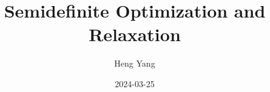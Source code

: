 \documentclass[
]{book}
\title{Semidefinite Optimization and Relaxation}
\author{Heng Yang}
\date{2024-03-25}
\theoremstyle{definition}
\theoremstyle{definition}
\theoremstyle{definition}
\theoremstyle{definition}
\theoremstyle{remark}
\begin{document}
\maketitle

{
\setcounter{tocdepth}{1}
\tableofcontents
}
\newcommand{\calG}{\mathcal{G}}
\newcommand{\calV}{\mathcal{V}}
\newcommand{\calE}{\mathcal{E}}
\newcommand{\calF}{\mathcal{F}}
\newcommand{\calP}{\mathcal{P}}
\newcommand{\calQ}{\mathcal{Q}}
\newcommand{\calA}{\mathcal{A}}
\newcommand{\calK}{\mathcal{K}}
\newcommand{\calS}{\mathcal{S}}
\newcommand{\calM}{\mathcal{M}}
\newcommand{\calI}{\mathcal{I}}
\newcommand{\calR}{\mathcal{R}}
\newcommand{\calZ}{\mathcal{Z}}
\newcommand{\mathx}{\mathrm{x}}
\newcommand{\mathy}{\mathrm{y}}
\newcommand{\bbE}{\mathbb{E}}
\newcommand{\calN}{\mathcal{N}}
\newcommand{\tldR}{\tilde{R}}
\newcommand{\bbZ}{\mathbb{Z}}
\newcommand{\bbQ}{\mathbb{Q}}
\newcommand{\bbC}{\mathbb{C}}
\newcommand{\bbF}{\mathbb{F}}
\newcommand{\bbR}{\mathbb{R}}

\newcommand{\Real}[1]{\mathbb{R}^{#1}}
\newcommand{\Comp}[1]{\mathbb{C}^{#1}}
\newcommand{\sym}[1]{\mathbb{S}^{#1}}
\newcommand{\psd}[1]{\sym{#1}_{+}}
\newcommand{\pd}[1]{\sym{#1}_{++}}
\newcommand{\inprod}[2]{\langle #1, #2 \rangle}
\newcommand{\linprod}[2]{\left\langle #1, #2 \right\rangle}
\newcommand{\trace}{\mathrm{tr}}
\newcommand{\tran}{^\top}

\newcommand{\rank}{\mathrm{rank}}
\newcommand{\diag}{\mathrm{diag}}
\newcommand{\Diag}{\mathrm{Diag}}
\newcommand{\BlkDiag}{\mathrm{BlkDiag}}
\newcommand{\vectorize}{\mathrm{vec}}
\newcommand{\svec}{\mathrm{svec}}
\newcommand{\mat}{\mathrm{mat}}
\newcommand{\smat}{\mathrm{smat}}
\newcommand{\norm}[1]{\Vert #1 \Vert}
\newcommand{\lnorm}[1]{\left\Vert #1 \right\Vert}
\newcommand{\pnorm}[2]{\Vert #1 \Vert_{#2}}
\newcommand{\Fnorm}[1]{\Vert #1 \Vert_\mathrm{F}}
\newcommand{\conv}{\mathrm{conv}}
\newcommand{\cone}{\mathrm{cone}}
\newcommand{\interior}{\mathrm{int}}
\newcommand{\relint}{\mathrm{ri}}
\newcommand{\poly}[1]{\mathbb{R}[#1]}
\newcommand{\SOd}{\mathrm{SO}(d)}
\newcommand{\SOthree}{\mathrm{SO}(3)}
\newcommand{\Od}{\mathrm{O}(d)}
\newcommand{\Ogroup}{\mathrm{O}}
\newcommand{\usphere}{\mathcal{S}}
\newcommand{\bmath}[1]{\boldsymbol{#1}}
\newcommand{\lbrkt}{[\![}
\newcommand{\rbrkt}{]\!]}
\newcommand{\brkt}[1]{\lbrkt #1 \rbrkt}
\newcommand{\bracket}[1]{[ #1 ]}
\newcommand{\sign}{\mathrm{sgn}}
\end{document}
